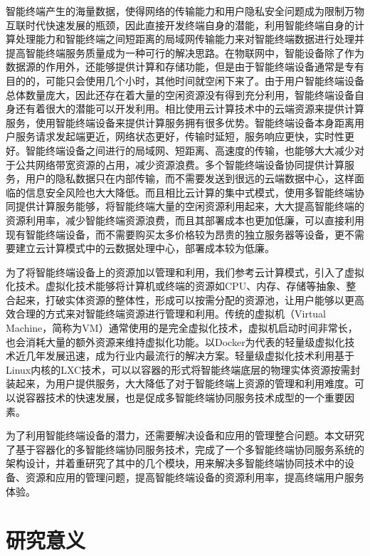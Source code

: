 智能终端产生的海量数据，使得网络的传输能力和用户隐私安全问题成为限制万物互联时代快速发展的瓶颈，因此直接开发终端自身的潜能\citep{王劲林2015一种现场}，利用智能终端自身的计算处理能力和智能终端之间短距离的局域网传输能力来对智能终端数据进行处理并提高智能终端服务质量成为一种可行的解决思路。在物联网中，智能设备除了作为数据源的作用外，还能够提供计算和存储功能，但是由于智能终端设备通常是专有目的的，可能只会使用几个小时，其他时间就空闲下来了\citep{renner2016towards}。由于用户智能终端设备总体数量庞大，因此还存在着大量的空闲资源没有得到充分利用，智能终端设备自身还有着很大的潜能可以开发利用。相比使用云计算技术中的云端资源来提供计算服务，使用智能终端设备来提供计算服务拥有很多优势。智能终端设备本身距离用户服务请求发起端更近，网络状态更好，传输时延短，服务响应更快，实时性更好。智能终端设备之间进行的局域网、短距离、高速度的传输，也能够大大减少对于公共网络带宽资源的占用，减少资源浪费。多个智能终端设备协同提供计算服务，用户的隐私数据只在内部传输，而不需要发送到很远的云端数据中心，这样面临的信息安全风险也大大降低。而且相比云计算的集中式模式，使用多智能终端协同提供计算服务能够，将智能终端大量的空闲资源利用起来，大大提高智能终端的资源利用率，减少智能终端资源浪费，而且其部署成本也更加低廉，可以直接利用现有智能终端设备，而不需要购买太多价格较为昂贵的独立服务器等设备，更不需要建立云计算模式中的云数据处理中心，部署成本较为低廉。

为了将智能终端设备上的资源加以管理和利用，我们参考云计算模式，引入了虚拟化技术。虚拟化技术能够将计算机或终端的资源如CPU、内存、存储等抽象、整合起来，打破实体资源的整体性，形成可以按需分配的资源池，让用户能够以更高效合理的方式来对智能终端资源进行管理和利用。传统的虚拟机（Virtual Machine，简称为VM）通常使用的是完全虚拟化技术，虚拟机启动时间非常长，也会消耗大量的额外资源来维持虚拟化功能。以Docker为代表的轻量级虚拟化技术近几年发展迅速，成为行业内最流行的解决方案。轻量级虚拟化技术利用基于Linux内核的LXC技术，可以以容器的形式将智能终端底层的物理实体资源按需封装起来，为用户提供服务，大大降低了对于智能终端上资源的管理和利用难度。可以说容器技术的快速发展，也是促成多智能终端协同服务技术成型的一个重要因素。

为了利用智能终端设备的潜力，还需要解决设备和应用的管理整合问题\citep{morabito2017evaluating}。本文研究了基于容器化的多智能终端协同服务技术，完成了一个多智能终端协同服务系统的架构设计，并着重研究了其中的几个模块，用来解决多智能终端协同技术中的设备、资源和应用的管理问题，提高智能终端设备的资源利用率，提高终端用户服务体验。



\section{研究意义}

